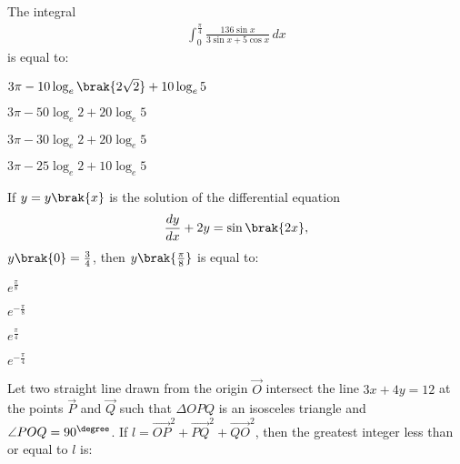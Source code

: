 \iffalse
\title{Assignment-3}
\author{EE24BTECH11049-Patnam Shariq Faraz Muhammed}
\section{mcq-single}
\fi

%
    \item 
    The integral 
    \begin{align*}
        \int_0^{\frac{\pi}{4}}\frac{136\sin{x}}{3\sin{x} + 5\cos{x}}\, dx 
    \end{align*}
    is equal to:

    \hfill{}

    \begin{enumerate}
    \begin{multicols}{2}
        \item $3\pi - 10\log_e\brak{2\sqrt{2}} + 10\log_e5$
        \item $3\pi - 50\log_e2 + 20\log_e5$
        \item $3\pi - 30\log_e2 + 20\log_e5$
        \item $3\pi - 25\log_e2 + 10\log_e5$
    \end{multicols}   
    \end{enumerate}

    \item 
    If $y = y\brak{x}$ is the solution of the differential equation 
    \begin{align*}
        \frac{dy}{dx} + 2y = \sin{\brak{2x}},
    \end{align*}
    $y\brak{0} = \frac{3}{4}$, then $y\brak{\frac{\pi}{8}}$ is equal to:

    \hfill{}

    \begin{enumerate}
    \begin{multicols}{4}
        \item $e^{\frac{\pi}{8}}$
        \item $e^{-\frac{\pi}{8}}$
        \item $e^{\frac{\pi}{4}}$
        \item $e^{-\frac{\pi}{4}}$
    \end{multicols}   
    \end{enumerate}

    \item 
    Let two straight line drawn from the origin $\vec{O}$ intersect the line $3x + 4y = 12$ at the points $\vec{P}$ and $\vec{Q}$ such that $\Delta OPQ$ is an isosceles triangle and $\angle POQ = 90^{\degree}$. If $l = \vec{OP}^2 + \vec{PQ}^2 + \vec{QO}^2$, then the greatest integer less than or equal to $l$ is:

